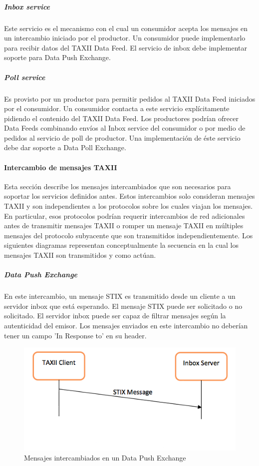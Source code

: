 \subparagraph{Inbox service}
Este servicio es el mecanismo con el cual un consumidor acepta los mensajes en 
un intercambio iniciado por el productor. Un consumidor puede implementarlo 
para recibir datos del TAXII Data Feed.
El servicio de inbox debe implementar soporte para Data Push Exchange.

\subparagraph{Poll service}
Es provisto por un productor para permitir pedidos al TAXII Data Feed iniciados 
por  el consumidor. Un consumidor contacta a este servicio explícitamente 
pidiendo el contenido del TAXII Data Feed. Los productores podrían ofrecer Data 
Feeds combinando envíos al Inbox service del consumidor o por medio de pedidos 
al servicio de poll de productor.
Una implementación de éste servicio debe dar soporte a Data Poll Exchange.

\paragraph{Intercambio de mensajes TAXII}

Esta sección describe los mensajes intercambiados que son necesarios para soportar 
los servicios definidos antes. Estos intercambios solo consideran mensajes 
TAXII y son independientes a los protocolos sobre los cuales viajan los mensajes.
 En particular, esos protocolos podrían requerir intercambios de red 
adicionales antes de transmitir mensajes TAXII o romper un mensaje TAXII en 
múltiples mensajes del protocolo subyacente que son transmitidos 
independientemente. Los siguientes diagramas representan conceptualmente la 
secuencia en la cual los mensajes TAXII son transmitidos y como actúan.

\subparagraph{Data Push Exchange}
En este intercambio, un mensaje STIX es transmitido desde un cliente a un 
servidor inbox que está esperando. El mensaje STIX puede ser solicitado o no 
solicitado. El servidor inbox puede ser capaz de filtrar mensajes según la 
autenticidad del emisor. Los mensajes enviados en este intercambio no deberían 
tener un campo 'In Response to' en su header.

\begin{figure}[ht!]
  \centering
    \includegraphics[width=150mm]{./images/DataPushExchange.png}
    \caption{Mensajes intercambiados en un Data Push Exchange \protect\cite{b1}}
\end{figure}


